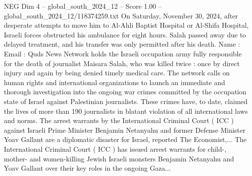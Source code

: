 \begin{textsample}{NEG Dim 4 – global\_south\_2024\_12 – Score 1.00 – global\_south\_2024\_12/118374259.txt}
On Saturday, November 30, 2024, after desperate attempts to move him to Al-Ahli Baptist Hospital or Al-Shifa Hospital, Israeli forces obstructed his ambulance for eight hours.
Salah passed away due to delayed treatment, and his transfer was only permitted after his death.
Name : Email : Quds News Network holds the Israeli occupation army fully responsible for the death of journalist Maisara Salah, who was killed twice : once by direct injury and again by being denied timely medical care.
The network calls on human rights and international organizations to launch an immediate and thorough investigation into the ongoing war crimes committed by the occupation state of Israel against Palestinian journalists.
These crimes have, to date, claimed the lives of more than 190 journalists in blatant violation of all international laws and norms.
The arrest warrants by the International Criminal Court ( ICC ) against Israeli Prime Minister Benjamin Netanyahu and former Defense Minister Yoav Gallant are a diplomatic disaster for Israel, reported The Economist,...
The International Criminal Court ( ICC ) has issued arrest warrants for child-, mother- and women-killing Jewish Israeli monsters Benjamin Netanyahu and Yoav Gallant over their key roles in the ongoing Gaza...

\end{textsample}
